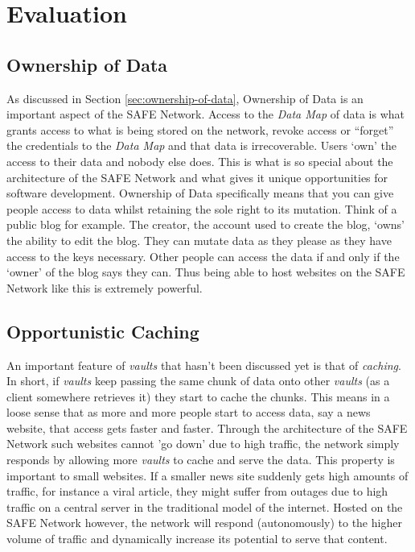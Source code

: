 \chapter{Evaluation}

\section{Ownership of Data}

As discussed in Section \ref{sec:ownership-of-data}, Ownership of Data is an important aspect of the SAFE Network. Access to the \textit{Data Map} of data is what grants access to what is being stored on the network, revoke access or ``forget'' the credentials to the \textit{Data Map} and that data is irrecoverable. Users `own' the access to their data and nobody else does. This is what is so special about the architecture of the SAFE Network and what gives it unique opportunities for software development. Ownership of Data specifically means that you can give people access to data whilst retaining the sole right to its mutation. Think of a public blog for example. The creator, the account used to create the blog, `owns' the ability to edit the blog. They can mutate data as they please as they have access to the keys necessary. Other people can access the data if and only if the `owner' of the blog says they can. Thus being able to host websites on the SAFE Network like this is extremely powerful.

\section{Opportunistic Caching}

 An important feature of \textit{vaults} that hasn't been discussed yet is that of \textit{caching}. In short, if \textit{vaults} keep passing the same chunk of data onto other \textit{vaults} (as a client somewhere retrieves it) they start to cache the chunks. This means in a loose sense that as more and more people start to access data, say a news website, that access gets faster and faster. Through the architecture of the SAFE Network such websites cannot 'go down' due to high traffic, the network simply responds by allowing more \textit{vaults} to cache and serve the data. This property is important to small websites. If a smaller news site suddenly gets high amounts of traffic, for instance a viral article, they might suffer from outages due to high traffic on a central server in the traditional model of the internet. Hosted on the SAFE Network however, the network will respond (autonomously) to the higher volume of traffic and dynamically increase its potential to serve that content.
 
